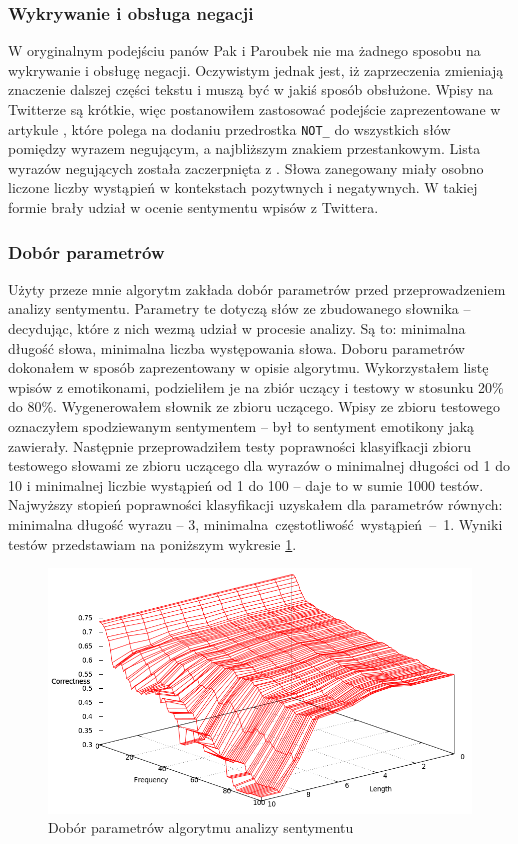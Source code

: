 \subsubsection{Wykrywanie i obsługa negacji}
W oryginalnym podejściu panów Pak i Paroubek nie ma żadnego sposobu na
wykrywanie i obsługę negacji. Oczywistym jednak jest, iż zaprzeczenia zmieniają
znaczenie dalszej części tekstu i muszą być w jakiś sposób obsłużone.
Wpisy na Twitterze są krótkie, więc postanowiłem zastosować podejście
zaprezentowane w artykule \cite{thumbsUp2002}, które polega na dodaniu
przedrostka \texttt{NOT\_} do wszystkich słów pomiędzy wyrazem negującym,
a najbliższym znakiem przestankowym. Lista wyrazów negujących
została zaczerpnięta z \cite{englishNots1983}. Słowa zanegowany miały osobno
liczone liczby wystąpień w kontekstach pozytwnych i negatywnych. W takiej formie
brały udział w ocenie sentymentu wpisów z Twittera.


\subsubsection{Dobór parametrów}
Użyty przeze mnie algorytm zakłada dobór parametrów przed przeprowadzeniem
analizy sentymentu. Parametry te dotyczą słów ze zbudowanego słownika --
decydując, które z nich wezmą udział w procesie analizy. Są to: minimalna
długość słowa, minimalna liczba występowania słowa. Doboru parametrów dokonałem
w sposób zaprezentowany w opisie algorytmu. Wykorzystałem listę wpisów z
emotikonami, podzieliłem je na zbiór uczący i testowy w stosunku 20\% do 80\%.
Wygenerowałem słownik ze zbioru uczącego. Wpisy ze zbioru testowego oznaczyłem spodziewanym
sentymentem -- był to sentyment emotikony jaką zawierały. Następnie
przeprowadziłem testy poprawności klasyifkacji zbioru testowego słowami ze
zbioru uczącego dla wyrazów o minimalnej długości od 1 do 10 i minimalnej
liczbie wystąpień od 1 do 100 -- daje to w sumie 1000 testów.
Najwyższy stopień poprawności klasyfikacji uzyskałem dla parametrów równych:
minimalna długość wyrazu -- 3, \mbox{minimalna częstotliwość wystąpień -- 1}.
Wyniki testów przedstawiam na poniższym wykresie
\ref{image:pak-paroubek-parametry}.

\begin{figure}[ht!]
\centering
\includegraphics[width=140mm]{img/pak-paroubek-params.png}
\caption{Dobór parametrów algorytmu analizy sentymentu}
\label{image:pak-paroubek-parametry}
\end{figure}


